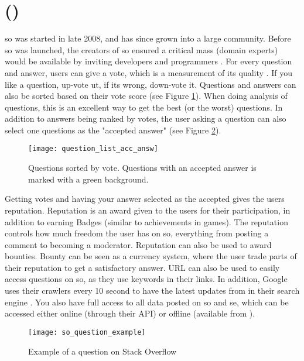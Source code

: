 \label{chap:chapter2}

\section[Stack Overflow]{ ()}
\label{sec:stackoverflow}

\gls{so} was started in late 2008, and has since grown into a large community. 
Before \gls{so} was launched, the creators of \gls{so} ensured a critical mass (domain experts) would be available by inviting developers and programmers \cite{M.Sewak2010, Treude2011}.
For every question and answer, users can give a vote, which is a measurement of its quality \cite{M.Sewak2010}. 
If you like a question, up-vote ut, if its wrong, down-vote it. 
Questions and answers can also be sorted based on their vote score (see Figure \ref{fig:question_list_acc_answ}). 
When doing analysis of questions, this is an excellent way to get the best (or the worst) questions.
In addition to answers being ranked by votes, the user asking a question can also select one questions as the "accepted answer" (see Figure \ref{fig:so_question_example}).
\begin{figure}[ht]
	\centering
	\texttt{[image: question\_list\_acc\_answ]}
	\caption{Questions sorted by vote. Questions with an accepted answer is marked with a green background.}
	\label{fig:question_list_acc_answ}
\end{figure}
\vspace{0.5em}\newline	
Getting votes and having your answer selected as the accepted gives the users reputation. 
Reputation is an award given to the users for their participation, in addition to earning Badges (similar to achievements in games).
The reputation controls how much freedom the user has on \gls{so}, everything from posting a comment to becoming a moderator. 
Reputation can also be used to award bounties. 
Bounty can be seen as a currency system, where the user trade parts of their reputation to get a satisfactory answer.
URL can also be used to easily access questions on \gls{so}, as they use keywords in their links. 
In addition, Google uses their crawlers every 10 second to have the latest updates from  in their search engine \cite{Gobry2011}.
You also have full access to all data posted on \gls{so} and \gls{se}, which can be accessed either online (through their API) or offline (available from \textcite{StackExchange2016}).
\clearpage
\begin{figure}[ht]
	\centering
	\texttt{[image: so\_question\_example]}
	\caption[Example of a question on Stack Overflow]{Example of a question on Stack Overflow\footnotemark}
	\label{fig:so_question_example}
\end{figure}

